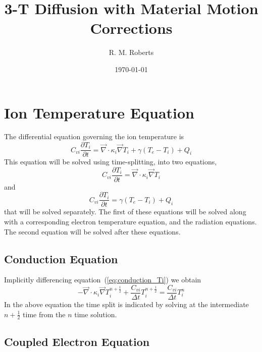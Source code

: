 \documentclass[12pt]{article}
\newcommand{\partl}[2]{\ensuremath{\frac{\partial{#1}}{\partial{#2}}}}\newcommand{\del}{\ensuremath{\vec{\nabla}}}
\begin{document}
\title{3-T Diffusion with Material Motion Corrections}
\author{R. M. Roberts}
\date{\today}

\maketitle

\newpage

\section{Ion Temperature Equation}

The differential equation governing the ion temperature is
\begin{equation}
        C_{vi} \partl{T_{i}}{t} = \del \cdot \kappa_{i} \del T_{i}
                                        + \gamma (T_{e}-T_{i}) + Q_{i}
\end{equation}
This equation will be solved using time-splitting, into two equations,
\begin{equation}
        C_{vi} \partl{T_{i}}{t} = \del \cdot \kappa_{i} \del T_{i}
\label{eq:conduction_Ti}
\end{equation}
and
\begin{equation}
        C_{vi} \partl{T_{i}}{t} = \gamma (T_{e}-T_{i}) + Q_{i}
\label{eq:couple_Ti}
\end{equation}
that will be solved separately.
The first of these equations will be solved along with a corresponding
electron temperature equation, and the radiation equations.
The second equation will be solved after these equations.

\subsection{Conduction Equation}

Implicitly differencing equation~(\ref{eq:conduction_Ti})
we obtain
\begin{equation}
  \boxed{
     - \del \cdot \kappa_{i} \del T_{i}^{n+\frac{1}{2}}
     + \frac{C_{vi}}{\Delta t} T_{i}^{n+\frac{1}{2}}
           = \frac{C_{vi}}{\Delta t} T_{i}^{n}
  }
\label{eq:conduction_Ti_tdiff}  
\end{equation}
In the above equation the time split is indicated by solving at the
intermediate $n+\frac{1}{2}$ time from the $n$ time solution.

\subsection{Coupled Electron Equation}
\end{document}
